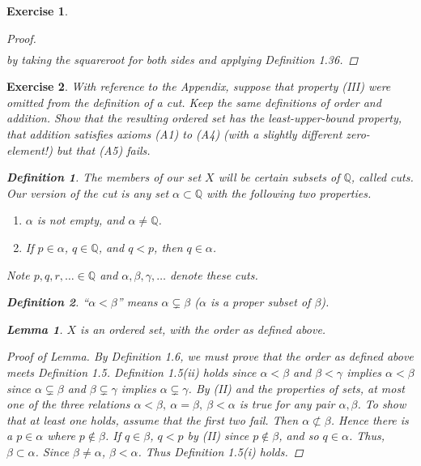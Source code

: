 \documentclass[10pt,letterpaper]{amsart}
\newtheorem{exercise}{Exercise}[section]
\theoremstyle{definition}
\newtheorem*{definition}{Definition}
\newtheorem*{lemma}{Lemma}
\theoremstyle{remark}
\numberwithin{equation}{exercise}
\begin{document}
\begin{multicols}{2}
\begin{exercise}
\begin{proof}
\begin{align*}
      \end{align*}
      by taking the squareroot for both sides and applying Definition 1.36.
    \end{proof}
  \end{exercise}
  \begin{exercise}\label{1.20}
    With reference to the Appendix, suppose that property \emph{(III)} were omitted from the definition of a cut. Keep the same definitions of order and addition. Show that the resulting ordered set has the least-upper-bound property, that addition satisfies axioms \emph{(A1)} to \emph{(A4)} (with a slightly different zero-element!) but that \emph{(A5)} fails.
    \begin{definition}
      The members of our set $X$ will be certain subsets of $\mathbb{Q}$, called \emph{cuts}. Our version of the cut is any set $\alpha \subset \mathbb{Q}$ with the following two properties.
      \begin{enumerate}
        \item[(I)] $\alpha$ is not empty, and $\alpha \ne \mathbb{Q}$.
        \item[(II)] If $p \in \alpha$, $q\in \mathbb{Q}$, and $q < p$, then $q \in \alpha$.
      \end{enumerate}
      Note $p,q,r,\ldots \in \mathbb{Q}$ and $\alpha,\beta,\gamma,\ldots$ denote these cuts.
    \end{definition}
    \begin{definition}
      ``$\alpha < \beta$'' means $\alpha \subsetneq \beta$ ($\alpha$ is a proper subset of $\beta$).
    \end{definition}
    \begin{lemma}
      $X$ is an ordered set, with the order as defined above.
    \end{lemma}
    \begin{proof}[Proof of Lemma]
      By Definition 1.6, we must prove that the order as defined above meets Definition 1.5. Definition 1.5(ii) holds since $\alpha < \beta$ and $\beta < \gamma$ implies $\alpha < \beta$ since $\alpha \subsetneq \beta$ and $\beta \subsetneq \gamma$ implies $\alpha \subsetneq \gamma$. By (II) and the properties of sets, at most one of the three relations $\alpha < \beta,\ \alpha = \beta,\ \beta < \alpha$ is true for any pair $\alpha,\beta$. To show that at least one holds, assume that the first two fail. Then $\alpha \not\subset \beta$. Hence there is a $p \in \alpha$ where $p \notin \beta$. If $q \in \beta$, $q < p$ by (II) since $p \notin \beta$, and so $q \in \alpha$. Thus, $\beta \subset \alpha$. Since $\beta \ne \alpha$, $\beta < \alpha$. Thus Definition 1.5(i) holds.

\end{proof}
\end{exercise}
\end{multicols}
\end{document}
